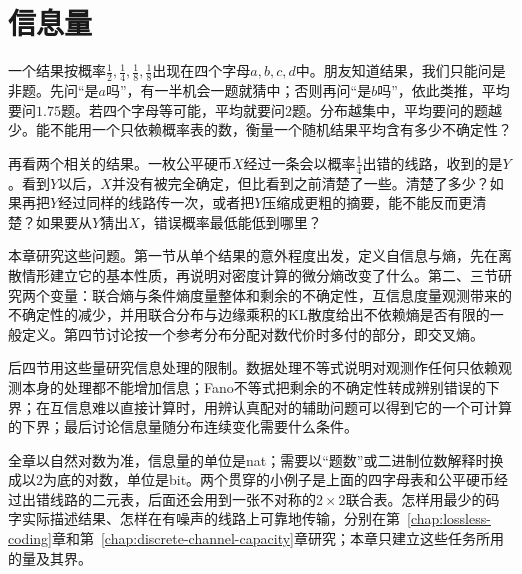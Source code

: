 \chapter{信息量}
\label{chap:information-measures}

一个结果按概率$\tfrac12,\tfrac14,\tfrac18,\tfrac18$出现在四个字母$a,b,c,d$中。朋友知道结果，我们只能问是非题。先问“是$a$吗”，有一半机会一题就猜中；否则再问“是$b$吗”，依此类推，平均要问$1.75$题。若四个字母等可能，平均就要问$2$题。分布越集中，平均要问的题越少。能不能用一个只依赖概率表的数，衡量一个随机结果平均含有多少不确定性？

再看两个相关的结果。一枚公平硬币$X$经过一条会以概率$\tfrac14$出错的线路，收到的是$Y$。看到$Y$以后，$X$并没有被完全确定，但比看到之前清楚了一些。清楚了多少？如果再把$Y$经过同样的线路传一次，或者把$Y$压缩成更粗的摘要，能不能反而更清楚？如果要从$Y$猜出$X$，错误概率最低能低到哪里？

本章研究这些问题。第一节从单个结果的意外程度出发，定义自信息与熵，先在离散情形建立它的基本性质，再说明对密度计算的微分熵改变了什么。第二、三节研究两个变量：联合熵与条件熵度量整体和剩余的不确定性，互信息度量观测带来的不确定性的减少，并用联合分布与边缘乘积的KL散度给出不依赖熵是否有限的一般定义。第四节讨论按一个参考分布分配对数代价时多付的部分，即交叉熵。

后四节用这些量研究信息处理的限制。数据处理不等式说明对观测作任何只依赖观测本身的处理都不能增加信息；Fano不等式把剩余的不确定性转成辨别错误的下界；在互信息难以直接计算时，用辨认真配对的辅助问题可以得到它的一个可计算的下界；最后讨论信息量随分布连续变化需要什么条件。

全章以自然对数为准，信息量的单位是nat；需要以“题数”或二进制位数解释时换成以$2$为底的对数，单位是bit。两个贯穿的小例子是上面的四字母表和公平硬币经过出错线路的二元表，后面还会用到一张不对称的$2\times2$联合表。怎样用最少的码字实际描述结果、怎样在有噪声的线路上可靠地传输，分别在第~\ref{chap:lossless-coding}章和第~\ref{chap:discrete-channel-capacity}章研究；本章只建立这些任务所用的量及其界。


















